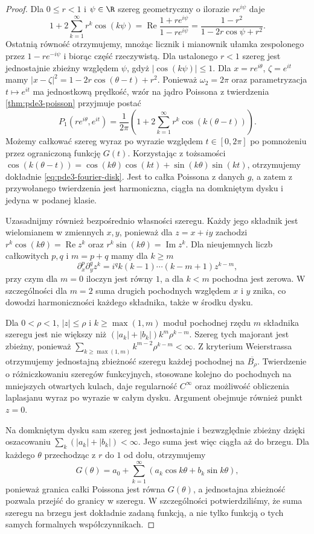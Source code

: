 \begin{proof}
Dla $0\leq r<1$ i $\psi\in\R$ szereg geometryczny
o ilorazie $re^{i\psi}$ daje
\[
 1+2\sum_{k=1}^\infty r^k\cos(k\psi)
 =\operatorname{Re}\frac{1+re^{i\psi}}{1-re^{i\psi}}
 =\frac{1-r^2}{1-2r\cos\psi+r^2}.
\]
Ostatnią równość otrzymujemy, mnożąc licznik
i mianownik ułamka zespolonego przez
$1-re^{-i\psi}$ i biorąc część rzeczywistą.
Dla ustalonego $r<1$ szereg jest jednostajnie
zbieżny względem $\psi$, gdyż $|\cos(k\psi)|\leq1$.
Dla $x=re^{i\theta}$, $\zeta=e^{it}$ mamy
$|x-\zeta|^2=1-2r\cos(\theta-t)+r^2$.
Ponieważ $\omega_2=2\pi$ oraz parametryzacja
$t\mapsto e^{it}$ ma jednostkową prędkość,
wzór na jądro Poissona z twierdzenia
\ref{thm:pde3-poisson} przyjmuje postać
\[
 P_1(re^{i\theta},e^{it})
 =\frac1{2\pi}\left(1+2\sum_{k=1}^\infty
                       r^k\cos(k(\theta-t))\right).
\]
Możemy całkować szereg wyraz po wyrazie względem
$t\in[0,2\pi]$ po pomnożeniu przez ograniczoną
funkcję $G(t)$. Korzystając z tożsamości
$\cos(k(\theta-t))=\cos(k\theta)\cos(kt)
+\sin(k\theta)\sin(kt)$, otrzymujemy dokładnie
\eqref{eq:pde3-fourier-disk}.
Jest to całka Poissona z danych $g$, a zatem
z przywołanego twierdzenia jest harmoniczna,
ciągła na domkniętym dysku i jedyna w podanej klasie.

Uzasadnijmy również bezpośrednio własności szeregu.
Każdy jego składnik jest wielomianem w zmiennych
$x,y$, ponieważ dla $z=x+iy$ zachodzi
$r^k\cos(k\theta)=\operatorname{Re}z^k$ oraz
$r^k\sin(k\theta)=\operatorname{Im}z^k$.
Dla nieujemnych liczb całkowitych $p,q$ i $m=p+q$
mamy dla $k\geq m$
\[
 \partial_x^p\partial_y^q z^k
 =i^q k(k-1)\cdots(k-m+1)z^{k-m},
\]
przy czym dla $m=0$ iloczyn jest równy $1$,
a dla $k<m$ pochodna jest zerowa.
W szczególności dla $m=2$ suma drugich pochodnych
względem $x$ i $y$ znika, co dowodzi harmoniczności
każdego składnika, także w środku dysku.

Dla $0<\rho<1$, $|z|\leq\rho$ i $k\geq\max(1,m)$
moduł pochodnej rzędu $m$ składnika szeregu
jest nie większy niż
$(|a_k|+|b_k|)k^m\rho^{k-m}$.
Szereg tych majorant jest zbieżny, ponieważ
$\sum_{k\geq\max(1,m)}k^{m-2}\rho^{k-m}<\infty$.
Z kryterium Weierstrassa otrzymujemy jednostajną
zbieżność szeregu każdej pochodnej na
$\overline{B_\rho}$. Twierdzenie o różniczkowaniu
szeregów funkcyjnych, stosowane kolejno do
pochodnych na mniejszych otwartych kulach, daje
regularność $C^\infty$ oraz możliwość obliczenia
laplasjanu wyraz po wyrazie w całym dysku.
Argument obejmuje również punkt $z=0$.

Na domkniętym dysku sam szereg jest jednostajnie
i bezwzględnie zbieżny dzięki oszacowaniu
$\sum_k(|a_k|+|b_k|)<\infty$.
Jego suma jest więc ciągła aż do brzegu.
Dla każdego $\theta$ przechodząc z $r$ do $1$
od dołu, otrzymujemy
\[
 G(\theta)=a_0+\sum_{k=1}^\infty
             (a_k\cos k\theta+b_k\sin k\theta),
\]
ponieważ granica całki Poissona jest równa
$G(\theta)$, a jednostajna zbieżność pozwala
przejść do granicy w szeregu. W szczególności
potwierdziliśmy, że suma szeregu na brzegu
jest dokładnie zadaną funkcją, a nie tylko
funkcją o tych samych formalnych współczynnikach.
\end{proof}

